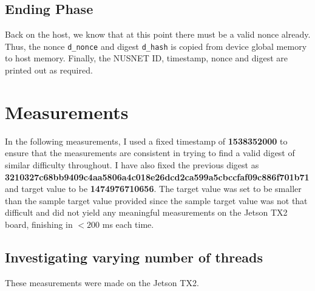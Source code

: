 \documentclass[12pt]{article}
\begin{document}
\subsection{Ending Phase}

Back on the host, we know that at this point there must be a valid nonce already. Thus, the nonce \verb!d_nonce! and digest \verb!d_hash! is copied from device global memory to host memory. Finally, the NUSNET ID, timestamp, nonce and digest are printed out as required.

\section{Measurements}

In the following measurements, I used a fixed timestamp of \textbf{1538352000} to ensure that the measurements are consistent in trying to find a valid digest of similar difficulty throughout. I have also fixed the previous digest as \textbf{3210327c68bb9409c4aa5806a4c018e26dcd2ca599a5cbccfaf09c886f701b71}
 and target value to be \textbf{1474976710656}. The target value was set to be smaller than the sample target value provided since the sample target value was not that difficult and did not yield any meaningful measurements on the Jetson TX2 board, finishing in $ < 200$ ms each time.
 
 
\subsection{Investigating varying number of threads}

These measurements were made on the Jetson TX2.
\end{document}
